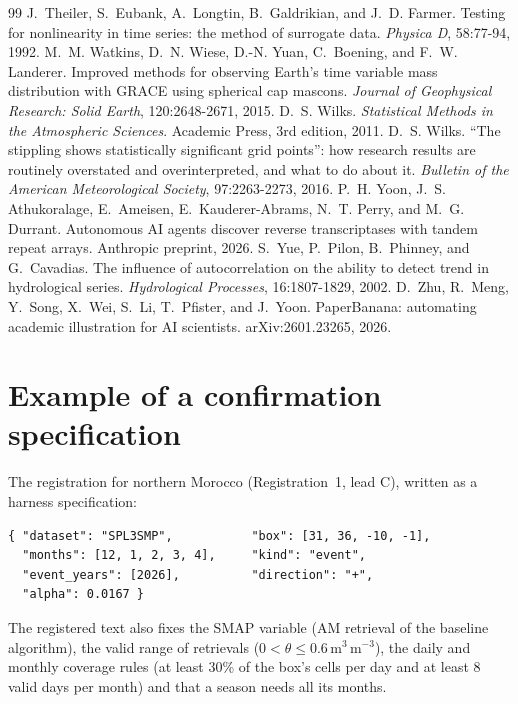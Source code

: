 \documentclass[11pt,a4paper]{article}
\begin{document}
\begin{thebibliography}{99}
 J.~Theiler, S.~Eubank, A.~Longtin, B.~Galdrikian, and J.~D. Farmer. Testing for nonlinearity in
  time series: the method of surrogate data. \emph{Physica D}, 58:77-94, 1992.
 M.~M. Watkins, D.~N. Wiese, D.-N. Yuan, C.~Boening, and F.~W. Landerer. Improved methods for
  observing Earth's time variable mass distribution with GRACE using spherical cap mascons. \emph{Journal of
  Geophysical Research: Solid Earth}, 120:2648-2671, 2015.
 D.~S. Wilks. \emph{Statistical Methods in the Atmospheric Sciences}. Academic Press, 3rd edition,
  2011.
 D.~S. Wilks. ``The stippling shows statistically significant grid points'': how research results
  are routinely overstated and overinterpreted, and what to do about it. \emph{Bulletin of the American Meteorological
  Society}, 97:2263-2273, 2016.
 P.~H. Yoon, J.~S. Athukoralage, E.~Ameisen, E.~Kauderer-Abrams, N.~T. Perry, and M.~G. Durrant.
  Autonomous AI agents discover reverse transcriptases with tandem repeat arrays. Anthropic preprint, 2026.
 S.~Yue, P.~Pilon, B.~Phinney, and G.~Cavadias. The influence of autocorrelation on the ability to
  detect trend in hydrological series. \emph{Hydrological Processes}, 16:1807-1829, 2002.
 D.~Zhu, R.~Meng, Y.~Song, X.~Wei, S.~Li, T.~Pfister, and J.~Yoon. PaperBanana: automating academic
  illustration for AI scientists. arXiv:2601.23265, 2026.
\end{thebibliography}
\normalsize

\appendix
\section{Example of a confirmation specification}
\label{app:spec}
The registration for northern Morocco (Registration~1, lead C), written as a harness specification:
\begin{verbatim}
{ "dataset": "SPL3SMP",           "box": [31, 36, -10, -1],
  "months": [12, 1, 2, 3, 4],     "kind": "event",
  "event_years": [2026],          "direction": "+",
  "alpha": 0.0167 }
\end{verbatim}
The registered text also fixes the SMAP variable (AM retrieval of the baseline algorithm), the valid range of
retrievals ($0 < \theta \le 0.6$\,m$^3$\,m$^{-3}$), the daily and monthly coverage rules (at least 30\% of the box's
cells per day and at least 8 valid days per month) and that a season needs all its months.
\end{document}
